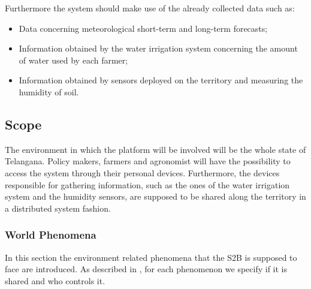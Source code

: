 Furthermore the system should make use of the already collected data such as:
\begin{itemize}
    \item Data concerning meteorological short-term and long-term forecasts;
    \item Information obtained by the water irrigation system concerning the amount of water used by each farmer;
    \item Information obtained by sensors deployed on the territory and measuring the humidity of soil.
\end{itemize}


\subsection{Scope}
\label{sec:scope}
The environment in which the platform will be involved will be the whole state of Telangana. Policy makers, farmers and agronomist will have the possibility to access the system through their personal devices. Furthermore, the devices responsible for gathering information, such as the ones of the water irrigation system and the humidity sensors, are supposed to be shared along the territory in a distributed system fashion.

\newpage

\subsubsection{World Phenomena}
In this section the environment related phenomena that the S2B is supposed to face are introduced. As described in \cite{jackson_twatm}, for each phenomenon we specify if it is shared and who controls it.

